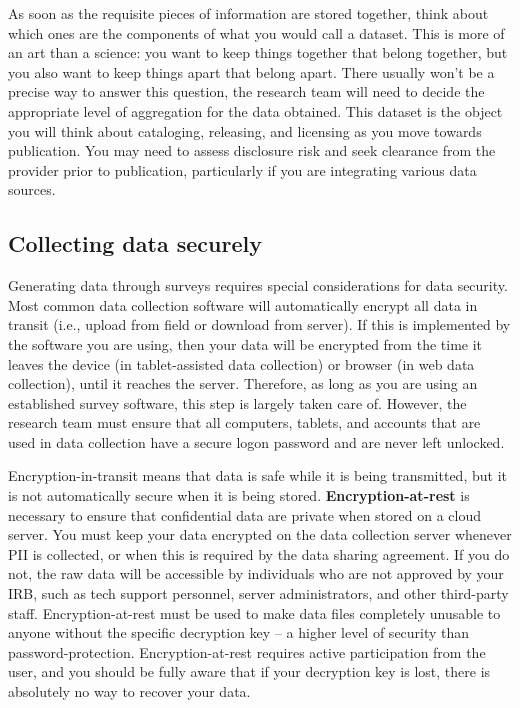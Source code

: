 As soon as the requisite pieces of information are stored together,
think about which ones are the components of what you would call a dataset.
This is more of an art than a science:
you want to keep things together that belong together,
but you also want to keep things apart that belong apart.
There usually won't be a precise way to answer this question,
the research team will need to decide the appropriate level of aggregation
for the data obtained.
This dataset is the object you will think about cataloging, releasing, and licensing
as you move towards publication.
You may need to assess disclosure risk and seek clearance from the provider prior to publication,
particularly if you are integrating various data sources.

\subsection{Collecting data securely}
Generating data through surveys requires special considerations for data security.
Most common data collection software will automatically encrypt
all data in transit (i.e., upload from field or download from server).
If this is implemented by the software you are using,
then your data will be encrypted from the time it leaves the device
(in tablet-assisted data collection) or browser (in web data collection),
until it reaches the server.
Therefore, as long as you are using an established survey software,
this step is largely taken care of.
However, the research team must ensure that all computers, tablets,
and accounts that are used in data collection have a secure logon
password and are never left unlocked.

Encryption-in-transit means that data is safe while it is being transmitted,
but it is not automatically secure when it is being stored.
\textbf{Encryption-at-rest}
is necessary to ensure that confidential data are private when stored on a cloud server.
You must keep your data encrypted on the data collection server whenever PII is collected,
or when this is required by the data sharing agreement.
If you do not, the raw data will be accessible by
individuals who are not approved by your IRB,
such as tech support personnel,
server administrators, and other third-party staff.
Encryption-at-rest must be used to make
data files completely unusable to anyone without the specific decryption key 
-- a higher level of security than password-protection.
Encryption-at-rest requires active participation from the user,
and you should be fully aware that if your decryption key is lost,
there is absolutely no way to recover your data.

